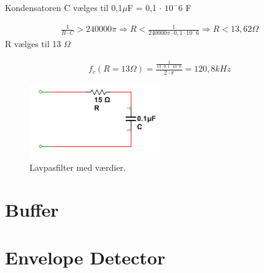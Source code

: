 Kondensatoren C vælges til 0,1$\mu$F  = 0,1 $\cdot$  $10^-6$ F

\begin{align}
	\frac{1}{R \cdot C} > 240000\pi \Rightarrow R < \frac{1}{240000\pi \cdot 0,1 \cdot 10^-6}
	\Rightarrow R < 13,62 \Omega
\end{align}
	R vælges til 13 $\Omega$
	
\begin{align}
	f_c (R=13\Omega) = \frac{\frac{1}{13 \cdot 0,1 \cdot 10^-6}}{2 \cdot \pi} =120,8kHz
\end{align}	
	
	
\begin{figure}[htbp]
	\centering
	\includegraphics[width=0.50\textwidth]{billeder/HWdesign/LP_MV.png}
	\caption{Lavpasfilter med værdier.}
	\label{fig:LP_MV}
\end{figure}

\section{Buffer}

\section{Envelope Detector}
